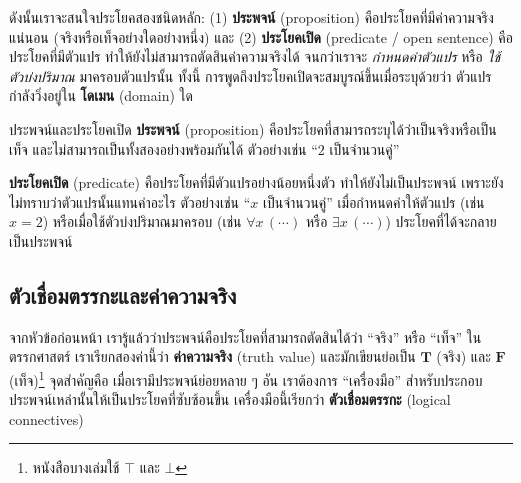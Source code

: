 ดังนั้นเราจะสนใจประโยคสองชนิดหลัก:
(1) \textbf{ประพจน์} (proposition) คือประโยคที่มีค่าความจริงแน่นอน (จริงหรือเท็จอย่างใดอย่างหนึ่ง)
และ (2) \textbf{ประโยคเปิด} (predicate / open sentence) คือประโยคที่มีตัวแปร ทำให้ยังไม่สามารถตัดสินค่าความจริงได้
จนกว่าเราจะ \emph{กำหนดค่าตัวแปร} หรือ \emph{ใช้ตัวบ่งปริมาณ} มาครอบตัวแปรนั้น
ทั้งนี้ การพูดถึงประโยคเปิดจะสมบูรณ์ขึ้นเมื่อระบุด้วยว่า ตัวแปรกำลังวิ่งอยู่ใน \textbf{โดเมน} (domain) ใด

\begin{defn}{ประพจน์และประโยคเปิด}{}
	\textbf{ประพจน์} (proposition) คือประโยคที่สามารถระบุได้ว่าเป็นจริงหรือเป็นเท็จ
	และไม่สามารถเป็นทั้งสองอย่างพร้อมกันได้
	ตัวอย่างเช่น ``$2$ เป็นจำนวนคู่''
	
	\textbf{ประโยคเปิด} (predicate) คือประโยคที่มีตัวแปรอย่างน้อยหนึ่งตัว ทำให้ยังไม่เป็นประพจน์
	เพราะยังไม่ทราบว่าตัวแปรนั้นแทนค่าอะไร
	ตัวอย่างเช่น ``$x$ เป็นจำนวนคู่''
	เมื่อกำหนดค่าให้ตัวแปร (เช่น $x=2$) หรือเมื่อใช้ตัวบ่งปริมาณมาครอบ (เช่น $\forall x\,(\cdots)$ หรือ $\exists x\,(\cdots)$)
	ประโยคที่ได้จะกลายเป็นประพจน์
\end{defn}


\subsection{ตัวเชื่อมตรรกะและค่าความจริง}
จากหัวข้อก่อนหน้า เรารู้แล้วว่าประพจน์คือประโยคที่สามารถตัดสินได้ว่า “จริง” หรือ “เท็จ”
ในตรรกศาสตร์ เราเรียกสองค่านี้ว่า \textbf{ค่าความจริง} (truth value) และมักเขียนย่อเป็น
$\mathbf{T}$ (จริง) และ $\mathbf{F}$ (เท็จ)\footnote{หนังสือบางเล่มใช้ $\top$ และ $\bot$}
จุดสำคัญคือ เมื่อเรามีประพจน์ย่อยหลาย ๆ อัน เราต้องการ “เครื่องมือ” สำหรับประกอบประพจน์เหล่านั้นให้เป็นประโยคที่ซับซ้อนขึ้น
เครื่องมือนี้เรียกว่า \textbf{ตัวเชื่อมตรรกะ} (logical connectives)

